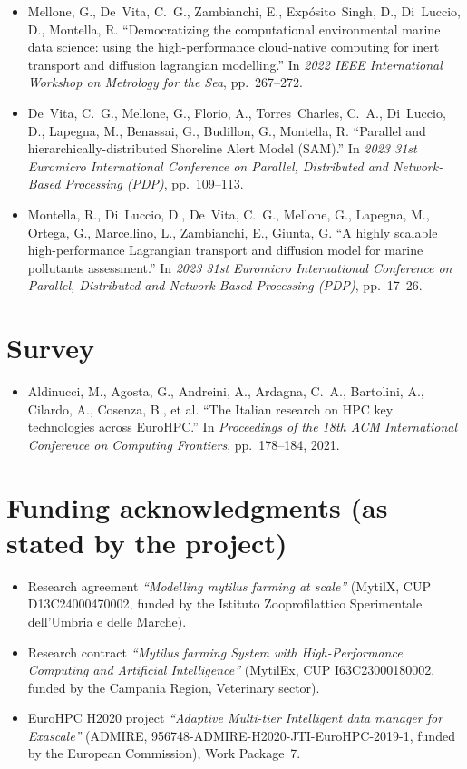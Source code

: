 \begin{itemize}[leftmargin=1.4em]
\item Mellone, G., De~Vita, C.~G., Zambianchi, E., Expósito~Singh, D., Di~Luccio, D., Montella, R.
``Democratizing the computational environmental marine data science: using the
high-performance cloud-native computing for inert transport and diffusion
lagrangian modelling.'' In \textit{2022 IEEE International Workshop on
Metrology for the Sea}, pp.~267--272.

\item De~Vita, C.~G., Mellone, G., Florio, A., Torres~Charles, C.~A., Di~Luccio, D., Lapegna, M., Benassai, G., Budillon, G., Montella, R.
``Parallel and hierarchically-distributed Shoreline Alert Model (SAM).'' In
\textit{2023 31st Euromicro International Conference on Parallel, Distributed
and Network-Based Processing (PDP)}, pp.~109--113.

\item Montella, R., Di~Luccio, D., De~Vita, C.~G., Mellone, G., Lapegna, M., Ortega, G., Marcellino, L., Zambianchi, E., Giunta, G.
``A highly scalable high-performance Lagrangian transport and diffusion model
for marine pollutants assessment.'' In \textit{2023 31st Euromicro
International Conference on Parallel, Distributed and Network-Based Processing
(PDP)}, pp.~17--26.
\end{itemize}

\section*{Survey}

\begin{itemize}[leftmargin=1.4em]
\item Aldinucci, M., Agosta, G., Andreini, A., Ardagna, C.~A., Bartolini, A., Cilardo, A., Cosenza, B., et al.
``The Italian research on HPC key technologies across EuroHPC.'' In
\textit{Proceedings of the 18th ACM International Conference on Computing
Frontiers}, pp.~178--184, 2021.
\end{itemize}

\section*{Funding acknowledgments (as stated by the project)}

\begin{itemize}[leftmargin=1.4em]
\item Research agreement \emph{``Modelling mytilus farming at scale''}
(MytilX, CUP D13C24000470002, funded by the Istituto Zooprofilattico
Sperimentale dell'Umbria e delle Marche).
\item Research contract \emph{``Mytilus farming System with High-Performance
Computing and Artificial Intelligence''} (MytilEx, CUP I63C23000180002,
funded by the Campania Region, Veterinary sector).
\item EuroHPC H2020 project \emph{``Adaptive Multi-tier Intelligent data
manager for Exascale''} (ADMIRE, 956748-ADMIRE-H2020-JTI-EuroHPC-2019-1,
funded by the European Commission), Work Package~7.
\end{itemize}
